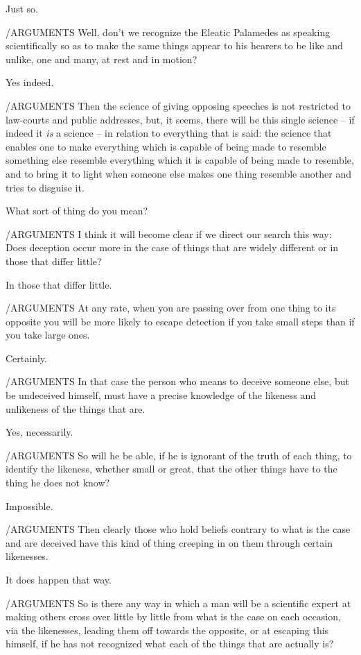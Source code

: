  Just so.

/ARGUMENTS Well, don't we recognize the Eleatic Palamedes as
speaking scientifically so as to make the same things appear to his
hearers to be like and unlike, one and many, at rest and in
motion?

Yes indeed.

/ARGUMENTS Then the science of giving opposing 
speeches is not restricted to law-courts and public addresses, 
but, it seems, there will be this single science -- if indeed it
{\em is} a science -- in relation to everything that is said: the
science that enables one to make everything which is capable of being
made to resemble something else resemble everything which it is capable
of being made to resemble, and to bring it to light when someone else
makes one thing resemble another and tries to disguise it.

What sort of thing do you mean? 

/ARGUMENTS I think it will become clear if we direct our search
this way: Does deception occur more in the case of things that are
widely different or in those that differ little?

In those that differ little. 

/ARGUMENTS At any rate, when you are passing over from one thing
to its opposite you will be more likely to escape detection if you take
small steps than if you take large ones.

Certainly.

/ARGUMENTS In that case the person who means to  deceive
someone else, but be undeceived himself, must have a precise knowledge
of the likeness and unlikeness of the things that
are.

Yes, necessarily.

/ARGUMENTS So will he be able, if he is ignorant of the truth of
each thing, to identify the likeness, whether small or  great,
that the other things have to the thing he does not know?

Impossible. 

/ARGUMENTS Then clearly those who hold beliefs contrary to what
is the case and are deceived have this kind of thing creeping in on them
through certain likenesses.

It does happen that way.

/ARGUMENTS So is there any way in which a man  will be a
scientific expert at making others cross over little by little from what
is the case on each occasion, via the likenesses, leading them off
towards the opposite, or at escaping this himself, if he has not
recognized what each of the things that are actually is?

